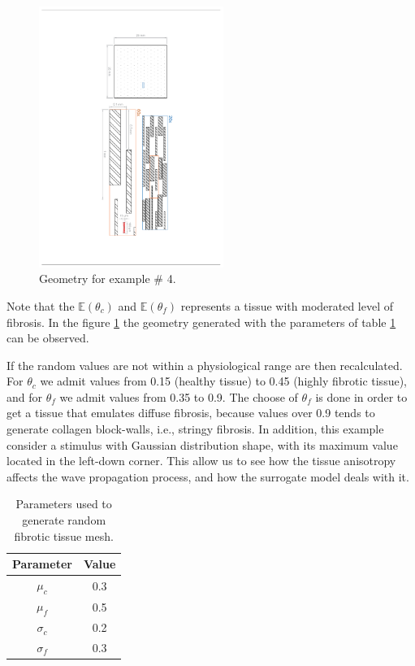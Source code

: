 \begin{figure}[!htbp]
	\centering
	\includegraphics[trim={7cm 3.5cm 5.5cm 3cm}, clip, width = 6cm, angle = 90]{fig/Numerical_Experiments/ex4/geometry}
	\caption{Geometry for example \# 4.} \label{fig:ex3_random}
\end{figure}

Note that the $\mathbb{E}(\theta_c)$ and $\mathbb{E}(\theta_f)$ represents a tissue with moderated level of fibrosis. In the figure \ref{fig:ex3_random} the geometry generated with the parameters of table \ref{tab:ex4_parametros_random} can be observed.

If the random values are not within a physiological range are then recalculated. For $\theta_c$ we admit values from 0.15 (healthy tissue) to 0.45 (highly fibrotic tissue), and for $\theta_f$ we admit values from 0.35 to 0.9. The choose of $\theta_f$ is done in order to get a tissue that emulates diffuse fibrosis, because values over 0.9 tends to generate collagen block-walls, i.e., stringy fibrosis. In addition, this example consider a stimulus with Gaussian distribution shape, with its maximum value located in the left-down corner. This allow us to see how the tissue anisotropy affects the wave propagation process, and how the surrogate model deals with it.

\begin{table}[!htbp]
	\centering
	\caption{Parameters used to generate random fibrotic tissue mesh.}
	\label{tab:ex4_parametros_random}
	\begin{tabular}{@{}cc@{}}
		\toprule
		Parameter  & Value \\ \midrule
		$\mu_c$    & 0.3   \\
		$\mu_f$    & 0.5   \\
		$\sigma_c$ & 0.2   \\
		$\sigma_f$ & 0.3   \\ \bottomrule
	\end{tabular}
\end{table}

